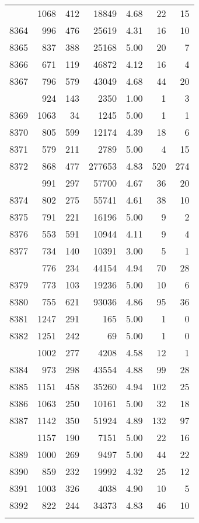 \documentclass[
]{article}
\begin{document}
\begin{table}
\begin{tabular}[t]{lrrrrrr}
\addlinespace
8363 & 1068 & 412 & 18849 & 4.68 & 22 & 15\\
8364 & 996 & 476 & 25619 & 4.31 & 16 & 10\\
8365 & 837 & 388 & 25168 & 5.00 & 20 & 7\\
8366 & 671 & 119 & 46872 & 4.12 & 16 & 4\\
8367 & 796 & 579 & 43049 & 4.68 & 44 & 20\\
\addlinespace
8368 & 924 & 143 & 2350 & 1.00 & 1 & 3\\
8369 & 1063 & 34 & 1245 & 5.00 & 1 & 1\\
8370 & 805 & 599 & 12174 & 4.39 & 18 & 6\\
8371 & 579 & 211 & 2789 & 5.00 & 4 & 15\\
8372 & 868 & 477 & 277653 & 4.83 & 520 & 274\\
\addlinespace
8373 & 991 & 297 & 57700 & 4.67 & 36 & 20\\
8374 & 802 & 275 & 55741 & 4.61 & 38 & 10\\
8375 & 791 & 221 & 16196 & 5.00 & 9 & 2\\
8376 & 553 & 591 & 10944 & 4.11 & 9 & 4\\
8377 & 734 & 140 & 10391 & 3.00 & 5 & 1\\
\addlinespace
8378 & 776 & 234 & 44154 & 4.94 & 70 & 28\\
8379 & 773 & 103 & 19236 & 5.00 & 10 & 6\\
8380 & 755 & 621 & 93036 & 4.86 & 95 & 36\\
8381 & 1247 & 291 & 165 & 5.00 & 1 & 0\\
8382 & 1251 & 242 & 69 & 5.00 & 1 & 0\\
\addlinespace
8383 & 1002 & 277 & 4208 & 4.58 & 12 & 1\\
8384 & 973 & 298 & 43554 & 4.88 & 99 & 28\\
8385 & 1151 & 458 & 35260 & 4.94 & 102 & 25\\
8386 & 1063 & 250 & 10161 & 5.00 & 32 & 18\\
8387 & 1142 & 350 & 51924 & 4.89 & 132 & 97\\
\addlinespace
8388 & 1157 & 190 & 7151 & 5.00 & 22 & 16\\
8389 & 1000 & 269 & 9497 & 5.00 & 44 & 22\\
8390 & 859 & 232 & 19992 & 4.32 & 25 & 12\\
8391 & 1003 & 326 & 4038 & 4.90 & 10 & 5\\
8392 & 822 & 244 & 34373 & 4.83 & 46 & 10\\
\addlinespace

\end{tabular}
\end{table}
\end{document}
